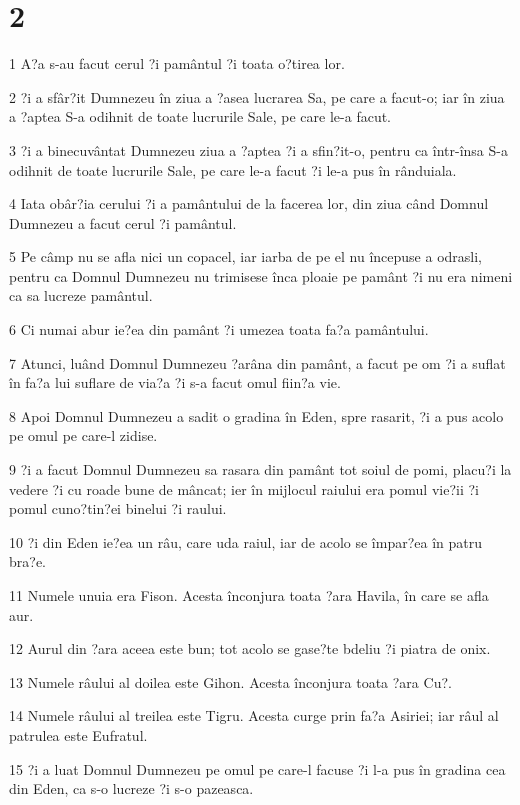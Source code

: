 \chapter{2}

\par 1 A?a s-au facut cerul ?i pamântul ?i toata o?tirea lor.
\par 2 ?i a sfâr?it Dumnezeu în ziua a ?asea lucrarea Sa, pe care a facut-o; iar în ziua a ?aptea S-a odihnit de toate lucrurile Sale, pe care le-a facut.
\par 3 ?i a binecuvântat Dumnezeu ziua a ?aptea ?i a sfin?it-o, pentru ca într-însa S-a odihnit de toate lucrurile Sale, pe care le-a facut ?i le-a pus în rânduiala.
\par 4 Iata obâr?ia cerului ?i a pamântului de la facerea lor, din ziua când Domnul Dumnezeu a facut cerul ?i pamântul.
\par 5 Pe câmp nu se afla nici un copacel, iar iarba de pe el nu începuse a odrasli, pentru ca Domnul Dumnezeu nu trimisese înca ploaie pe pamânt ?i nu era nimeni ca sa lucreze pamântul.
\par 6 Ci numai abur ie?ea din pamânt ?i umezea toata fa?a pamântului.
\par 7 Atunci, luând Domnul Dumnezeu ?arâna din pamânt, a facut pe om ?i a suflat în fa?a lui suflare de via?a ?i s-a facut omul fiin?a vie.
\par 8 Apoi Domnul Dumnezeu a sadit o gradina în Eden, spre rasarit, ?i a pus acolo pe omul pe care-l zidise.
\par 9 ?i a facut Domnul Dumnezeu sa rasara din pamânt tot soiul de pomi, placu?i la vedere ?i cu roade bune de mâncat; ier în mijlocul raiului era pomul vie?ii ?i pomul cuno?tin?ei binelui ?i raului.
\par 10 ?i din Eden ie?ea un râu, care uda raiul, iar de acolo se împar?ea în patru bra?e.
\par 11 Numele unuia era Fison. Acesta înconjura toata ?ara Havila, în care se afla aur.
\par 12 Aurul din ?ara aceea este bun; tot acolo se gase?te bdeliu ?i piatra de onix.
\par 13 Numele râului al doilea este Gihon. Acesta înconjura toata ?ara Cu?.
\par 14 Numele râului al treilea este Tigru. Acesta curge prin fa?a Asiriei; iar râul al patrulea este Eufratul.
\par 15 ?i a luat Domnul Dumnezeu pe omul pe care-l facuse ?i l-a pus în gradina cea din Eden, ca s-o lucreze ?i s-o pazeasca.
